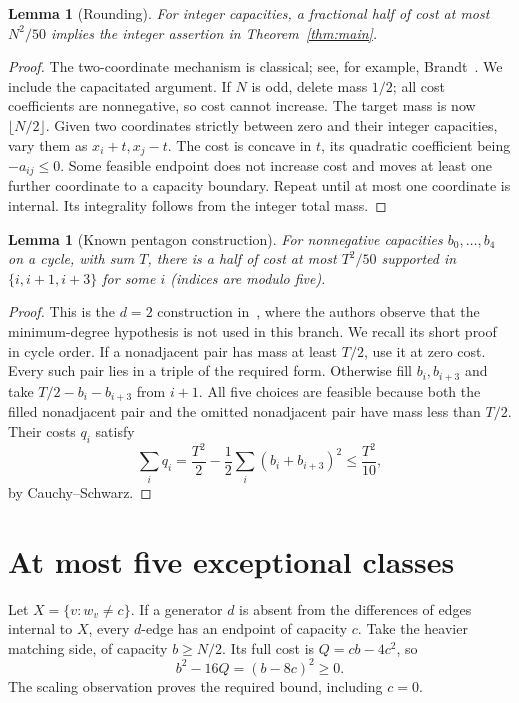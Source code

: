 \documentclass[11pt]{article}
\newtheorem{lemma}[theorem]{Lemma}
\begin{document}
\begin{lemma}[Rounding]\label{lem:rounding}
For integer capacities, a fractional half of cost at most $N^2/50$
implies the integer assertion in Theorem~\ref{thm:main}.
\end{lemma}
\begin{proof}
The two-coordinate mechanism is classical; see, for example,
Brandt~\cite[Proposition 1]{B}. We include the capacitated argument.
If $N$ is odd, delete mass $1/2$; all cost coefficients are nonnegative,
so cost cannot increase. The target mass is now $\lfloor N/2\rfloor$.
Given two coordinates strictly between zero and their integer capacities,
vary them as $x_i+t,x_j-t$. The cost is concave in $t$, its quadratic
coefficient being $-a_{ij}\leq0$. Some feasible endpoint does not increase
cost and moves at least one further coordinate to a capacity boundary.
Repeat until at most one coordinate is internal.
Its integrality follows from the integer total mass.
\end{proof}

\begin{lemma}[Known pentagon construction]\label{lem:c5}
For nonnegative capacities $b_0,\ldots,b_4$ on a cycle, with sum $T$,
there is a half of cost at most $T^2/50$ supported in
$\{i,i+1,i+3\}$ for some $i$ (indices are modulo five).
\end{lemma}
\begin{proof}
This is the $d=2$ construction in~\cite[proof of Theorem 3.1]{NY},
where the authors observe that the minimum-degree hypothesis is not
used in this branch. We recall its short proof in cycle order.
If a nonadjacent pair has mass at least $T/2$, use it at zero cost.
Every such pair lies in a triple of the required form.
Otherwise fill $b_i,b_{i+3}$ and take
$T/2-b_i-b_{i+3}$ from $i+1$. All five choices are feasible because
both the filled nonadjacent pair and the omitted nonadjacent pair
have mass less than $T/2$. Their costs $q_i$ satisfy
\[
 \sum_iq_i=\frac{T^2}{2}
   -\frac12\sum_i(b_i+b_{i+3})^2
 \leq \frac{T^2}{10},
\]
by Cauchy--Schwarz.
\end{proof}

\section{At most five exceptional classes}
Let $X=\{v:w_v\ne c\}$. If a generator $d$ is absent from the differences
of edges internal to $X$, every $d$-edge has an endpoint of capacity $c$.
Take the heavier matching side, of capacity $b\geq N/2$.
Its full cost is $Q=cb-4c^2$, so
\[
 b^2-16Q=(b-8c)^2\geq0.
\]
The scaling observation proves the required bound, including $c=0$.
\end{document}
